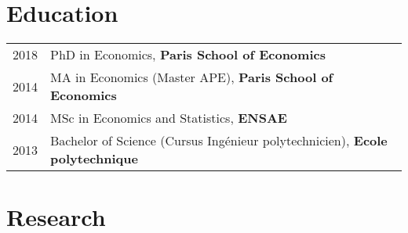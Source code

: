 \documentclass[12pt]{article}
\begin{document}
\section*{Education}
\begin{tabular}{p{2cm}l}	
 \textsc{2018} & PhD in Economics, \textbf{Paris School of Economics}\\
\textsc{2014} & MA in Economics (Master APE), \textbf{Paris School of Economics}\\
\textsc{2014} & MSc in Economics and Statistics, \textbf{ENSAE}\\
\textsc{2013} & Bachelor of Science (Cursus Ingénieur polytechnicien), \textbf{Ecole polytechnique}\\
\end{tabular}

\section*{Research}
\end{document}
